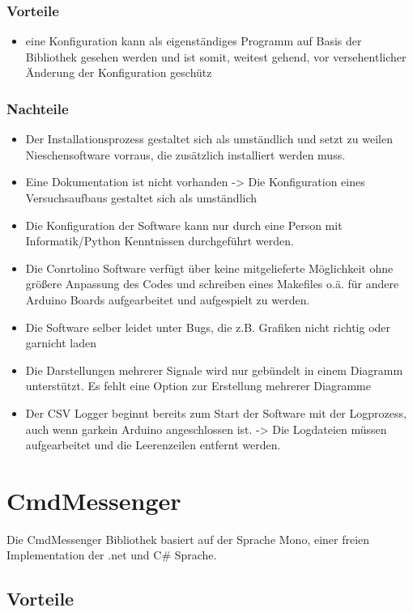 \documentclass[a4paper,10pt]{article}
\begin{document}
\subsubsection{Vorteile}
\begin{itemize}
 \item eine Konfiguration kann als eigenständiges Programm auf Basis der 
Bibliothek gesehen werden und ist somit, weitest gehend, vor versehentlicher 
Änderung der Konfiguration geschütz
\end{itemize}

\subsubsection{Nachteile}
\begin{itemize}
 \item Der Installationsprozess gestaltet sich als umständlich und setzt zu 
weilen Nieschensoftware vorraus, die zusätzlich installiert werden muss.
 \item Eine Dokumentation ist nicht vorhanden -> Die Konfiguration eines 
Versuchsaufbaus gestaltet sich als umständlich
 \item Die Konfiguration der Software kann nur durch eine Person mit 
Informatik/Python Kenntnissen durchgeführt werden.
 \item Die Conrtolino Software verfügt über keine mitgelieferte Möglichkeit 
ohne größere Anpassung des Codes und schreiben eines Makefiles o.ä. für andere 
Arduino Boards aufgearbeitet und aufgespielt zu werden.
 \item Die Software selber leidet unter Bugs, die z.B. Grafiken nicht richtig 
oder garnicht laden
 \item Die Darstellungen mehrerer Signale wird nur gebündelt in einem Diagramm 
unterstützt. Es fehlt eine Option zur Erstellung mehrerer Diagramme
 \item Der CSV Logger beginnt bereits zum Start der Software mit der 
Logprozess, auch wenn garkein Arduino angeschlossen ist. -> Die Logdateien 
müssen aufgearbeitet und die Leerenzeilen entfernt werden.
\end{itemize}

\section {CmdMessenger}
Die CmdMessenger Bibliothek basiert auf der Sprache Mono, einer freien 
Implementation der .net und C\# Sprache.
\subsection{Vorteile}
\end{document}
